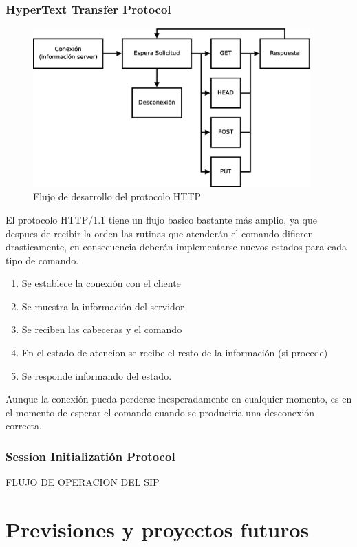 \documentclass[a4paper,spanish,12pt]{book}
\begin{document}
\subsection{HyperText Transfer Protocol}
\begin{figure}[h]
	\includegraphics[width=0.95\textwidth]{img/DiagramaFlujoHTTP.eps}
              \caption{Flujo de desarrollo del protocolo HTTP}
  \label{fig:DiagramaFlujoHTTP}
\end{figure}
El protocolo HTTP/1.1 tiene un flujo basico bastante más amplio, ya que despues de recibir la orden las rutinas que atenderán el comando difieren drasticamente, en consecuencia deberán implementarse nuevos estados para cada tipo de comando.
\begin{enumerate}
	\item Se establece la conexión con el cliente
	\item Se muestra la información del servidor
	\item Se reciben las cabeceras y el comando
	\item En el estado de atencion se recibe el resto de la información (si procede)
	\item Se responde informando del estado.
\end{enumerate}
Aunque la conexión pueda perderse inesperadamente en cualquier momento, es en el momento de esperar el comando cuando se produciría una desconexión correcta.
\subsection{Session Initializatión Protocol}
FLUJO DE OPERACION DEL SIP



\chapter{Previsiones y proyectos futuros}
\end{document}
